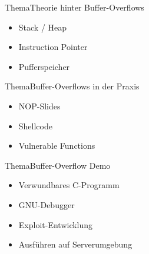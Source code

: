 \begin{frame}{Thema}{Theorie hinter Buffer-Overflows}
    \begin{itemize}
        \item Stack / Heap
        \item Instruction Pointer
        \item Pufferspeicher
    \end{itemize}
\end{frame}

\begin{frame}{Thema}{Buffer-Overflows in der Praxis}
    \begin{itemize}
        \item NOP-Slides
        \item Shellcode
        \item Vulnerable Functions
    \end{itemize}
\end{frame}

\begin{frame}{Thema}{Buffer-Overflow Demo}
    \begin{itemize}
        \item Verwundbares C-Programm
        \item GNU-Debugger
        \item Exploit-Entwicklung
        \item Ausführen auf Serverumgebung
    \end{itemize}
\end{frame}